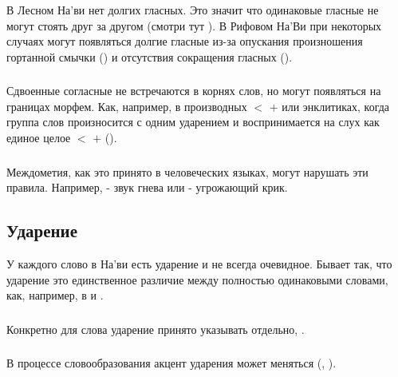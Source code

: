 \subsubsection{} В Лесном На'ви нет долгих гласных. Это значит что одинаковые гласные не могут стоять друг за другом (смотри тут
).  В Рифовом На'Ви при некоторых случаях могут появляться долгие гласные из-за опускания произношения гортанной смычки  () и отсутствия сокращения гласных
(). 

\subsubsection{} Сдвоенные согласные не встречаются в корнях слов, но могут появляться на границах морфем. Как, например, в производных
 $<$  $+$  или энклитиках, 
когда группа слов произносится с одним ударением и воспринимается на слух как единое целое 
 $<$  $+$  ().

\subsubsection{} Междометия, как это принято в человеческих языках, могут нарушать эти правила. Например,  - звук гнева или 
 - угрожающий крик.


\subsection{Ударение}
У каждого слово в На'ви есть ударение и не всегда очевидное.  Бывает так, что ударение это единственное различие между полностью одинаковыми словами, как, например, в  
и  .

\subsubsection{} Конкретно для слова  ударение принято указывать отдельно, .

\subsubsection{} В процессе словообразования акцент ударения может меняться
(, ).

